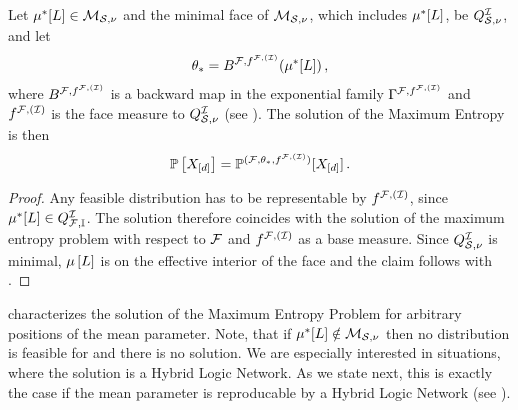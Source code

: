 \begin{theorem}
    \label{the:maxEntropyCharacterizationHLN}
    Let $\mu^*[L]\in\mathcal{M}_{\mathcal{S},\nu}$ and the minimal face of $\mathcal{M}_{\mathcal{S},\nu}$, which includes $\mu^*[L]$, be $Q^{\mathcal{I}}_{\mathcal{S},\nu}$, and let
    \begin{align*}
        \theta_{*} = B^{\mathcal{F},f^{\mathcal{F},(\mathcal{I})}}(\mu^*[L]) \, ,
    \end{align*}
    where $B^{\mathcal{F},f^{\mathcal{F},(\mathcal{I})}}$ is a backward map in the exponential family $\Gamma^{\mathcal{F},f^{\mathcal{F},(\mathcal{I})}}$ and $f^{\mathcal{F},(\mathcal{I})}$ is the face measure to $Q^{\mathcal{I}}_{\mathcal{S},\nu}$ (see ).
    The solution of the Maximum Entropy  is then
    \begin{align*}
        \mathbb{P}\left[X_{[d]}\right] = \mathbb{P}^{(\mathcal{F},\theta_{*},f^{\mathcal{F},(\mathcal{I})})}[X_{[d]}] \, .
    \end{align*}
\end{theorem}
\begin{proof}
    Any feasible distribution has to be representable by $f^{\mathcal{F},(\mathcal{I})}$, since $\mu^*[L]\in Q^{\mathcal{I}}_{\mathcal{F},\mathbb{I}}$.
    The solution therefore coincides with the solution of the maximum entropy problem with respect to $\mathcal{F}$ and $f^{\mathcal{F},(\mathcal{I})}$ as a base measure.
    Since $Q^{\mathcal{I}}_{\mathcal{S},\nu}$ is minimal, $\mu\left[L\right]$ is on the effective interior of the face and the claim follows with .
\end{proof}

 characterizes the solution of the Maximum Entropy Problem for arbitrary positions of the mean parameter.
Note, that if $\mu^*[L]\notin\mathcal{M}_{\mathcal{S},\nu}$ then no distribution is feasible for  and there is no solution.
We are especially interested in situations, where the solution is a Hybrid Logic Network.
As we state next, this is exactly the case if the mean parameter is reproducable by a Hybrid Logic Network (see ).

